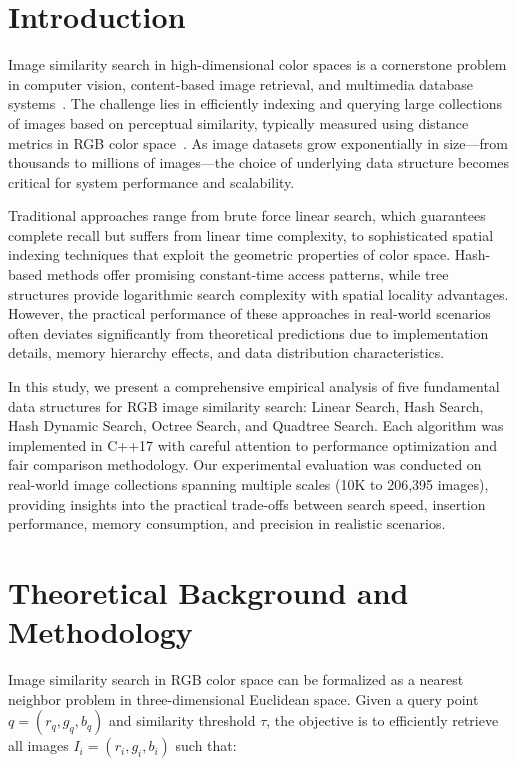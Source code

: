 \documentclass{sbc2023}
\begin{document}
\section{Introduction}
\label{sec:intro}

Image similarity search in high-dimensional color spaces is a cornerstone problem in computer vision, content-based image retrieval, and multimedia database systems~\cite{9035427}. The challenge lies in efficiently indexing and querying large collections of images based on perceptual similarity, typically measured using distance metrics in RGB color space~\cite{8394553}. As image datasets grow exponentially in size—from thousands to millions of images—the choice of underlying data structure becomes critical for system performance and scalability.

Traditional approaches range from brute force linear search, which guarantees complete recall but suffers from linear time complexity, to sophisticated spatial indexing techniques that exploit the geometric properties of color space. Hash-based methods offer promising constant-time access patterns, while tree structures provide logarithmic search complexity with spatial locality advantages. However, the practical performance of these approaches in real-world scenarios often deviates significantly from theoretical predictions due to implementation details, memory hierarchy effects, and data distribution characteristics.

In this study, we present a comprehensive empirical analysis of five fundamental data structures for RGB image similarity search: Linear Search, Hash Search, Hash Dynamic Search, Octree Search, and Quadtree Search. Each algorithm was implemented in C++17 with careful attention to performance optimization and fair comparison methodology. Our experimental evaluation was conducted on real-world image collections spanning multiple scales (10K to 206,395 images), providing insights into the practical trade-offs between search speed, insertion performance, memory consumption, and precision in realistic scenarios.

\section{Theoretical Background and Methodology}
\label{sec:methodology}

Image similarity search in RGB color space can be formalized as a nearest neighbor problem in three-dimensional Euclidean space. Given a query point $q = (r_q, g_q, b_q)$ and similarity threshold $\tau$, the objective is to efficiently retrieve all images $I_i = (r_i, g_i, b_i)$ such that:
\end{document}

